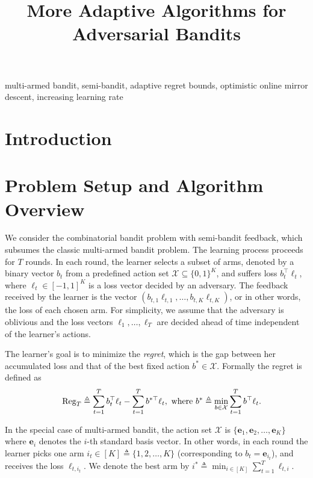 \documentclass[final, 12pt]{colt2018} %
\title[More Adaptive Algorithms for Adversarial Bandits]{More Adaptive Algorithms for Adversarial Bandits}
\newcommand{\reg}{\text{\rm Reg}}
\begin{document}
\maketitle

\begin{abstract}

\end{abstract}

\begin{keywords}
multi-armed bandit, semi-bandit, adaptive regret bounds, optimistic online mirror descent, increasing learning rate
\end{keywords}

\section{Introduction}


\section{Problem Setup and Algorithm Overview}
\label{section:notations}
We consider the combinatorial bandit problem with semi-bandit feedback, which subsumes the classic multi-armed bandit problem. The learning process proceeds for $T$ rounds. In each round, the learner selects a subset of arms, denoted by a binary vector $b_t$ from a predefined action set $\mathcal{X}\subseteq \{0,1\}^K$, and suffers loss $b_t^\top \ell_t$, where $\ell_t \in [-1,1]^K$ is a loss vector decided by an adversary. The feedback received by the learner is the vector $(b_{t,1}\ell_{t,1}, \ldots, b_{t,K}\ell_{t,K})$,
or in other words, the loss of each chosen arm. For simplicity, we assume that the adversary is oblivious and the loss vectors $\ell_1, \ldots, \ell_T$ are decided ahead of time independent of the learner's actions.

The learner's goal is to minimize the {\it regret}, which is the gap between her accumulated loss and that of the best fixed action $b^*\in\mathcal{X}$. Formally the regret is defined as
\begin{align*}
\reg_T\triangleq \sum_{t=1}^T b_t^\top \ell_{t}- \sum_{t=1}^T b^{*\top}\ell_{t}, \text{ where } b^*\triangleq \min_{b\in\mathcal{X}} \sum_{t=1}^T b^\top \ell_{t}. 
\end{align*}

In the special case of multi-armed bandit, the action set $\mathcal{X}$ is $\{\mathbf{e}_1, \mathbf{e}_2, \ldots, \mathbf{e}_K\}$ where $\mathbf{e}_i$ denotes the $i$-th standard basis vector. In other words, in each round the learner picks one arm $i_t \in [K] \triangleq \{1,2,\ldots,K\}$ (corresponding to $b_t = \mathbf{e}_{i_t}$), and receives the loss $\ell_{t,i_t}$. We denote the best arm by $i^* \triangleq \min_{i \in [K]} \sum_{t=1}^T \ell_{t, i}$.
\end{document}
